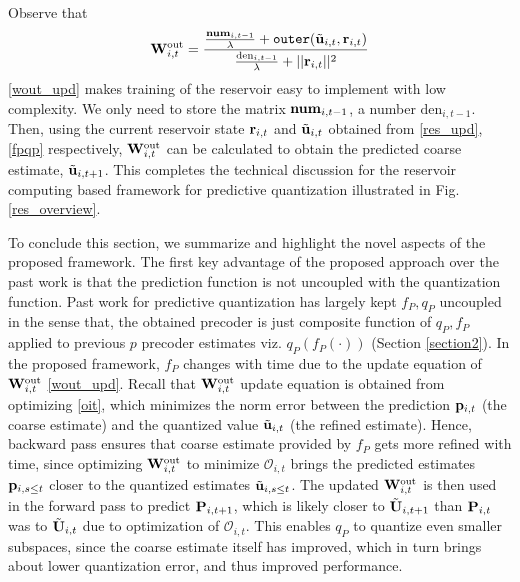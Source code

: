 \documentclass[conference]{IEEEtran}
\begin{document}
Observe that
\begin{equation}
\bW_{i,t}^{\text{out}}=\frac{\frac{\text{\textbf{num}}_{i,t-1}}{\lambda}+\texttt{outer}(\tilde{\bu}_{i,t},\br_{i,t})}{\frac{\text{den}_{i,t-1}}{\lambda}+||\br_{i,t}||^2}
\label{wout_upd}
\end{equation}
\eqref{wout_upd} makes training of the reservoir easy to implement with low complexity.
We only need to store the matrix $\text{\textbf{num}}_{i,t-1}$, a number $\text{den}_{i,t-1}$. Then, using the current reservoir state ${\bf r}_{i,t}$ and $\tilde{{\bf u}}_{i,t}$ obtained from \eqref{res_upd}, \eqref{fpqp} respectively, ${\bf W}_{i,t}^{\text{out}}$ can be calculated to obtain the predicted coarse estimate, $\tilde{{\bf u}}_{i,t+1}$.
This completes the technical discussion for the reservoir computing based framework for predictive quantization illustrated in Fig. \ref{res_overview}.

To conclude this section, we summarize and highlight the novel aspects of the proposed framework.
The first key advantage of the proposed approach over the past work \cite{Gupt1905:Predictive,6891198,6545375} is that the prediction function is not uncoupled with the quantization function.
Past work for predictive quantization has largely kept $f_P,q_P$ uncoupled in the sense that, the obtained precoder is just composite function of $q_P,f_P$ applied to previous $p$ precoder estimates viz. $q_P(f_P(\cdot))$ (Section \ref{section2}). In the proposed framework, $f_P$ changes with time due to the update equation of ${\bf W}_{i,t}^{\text{out}}$ \eqref{wout_upd}. Recall that ${\bf W}_{i,t}^{\text{out}}$ update equation is obtained from optimizing \eqref{oit}, which minimizes the norm error between the prediction ${\bf p}_{i,t}$ (the coarse estimate) and the quantized value $\tilde{{\bf u}}_{i,t}$ (the refined estimate). Hence, backward pass ensures that coarse estimate provided by $f_P$ gets more refined with time, since optimizing ${\bf W}_{i,t}^{\text{out}}$ to minimize $\mathcal{O}_{i,t}$ brings the predicted estimates ${\bf p}_{i,s\leq t}$ closer to the quantized estimates $\tilde{{\bf u}}_{i,s\leq t}$.
The updated ${\bf W}_{i,t}^{\text{out}}$ is then used in the forward pass to predict ${\bf P}_{i,t+1}$, which is likely closer to $\tilde{{\bf U}}_{i,t+1}$ than ${\bf P}_{i,t}$ was to $\tilde{{\bf U}}_{i,t}$ due to optimization of $\mathcal{O}_{i,t}$.
This enables $q_P$ to quantize even smaller subspaces, since the coarse estimate itself has improved, which in turn brings about lower quantization error, and thus improved performance.
\end{document}
